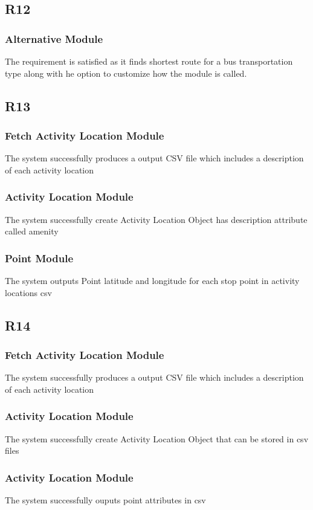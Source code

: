 \documentclass[12pt, titlepage]{article}
\begin{document}
\subsection{R12}
\subsubsection{Alternative Module}
The requirement is satisfied as it finds shortest route for a bus transportation type along with he option to customize how the module is called. 
\subsection{R13}
\subsubsection{Fetch Activity Location Module}
The system successfully produces a output CSV file which includes a description of each activity location

\subsubsection{Activity Location Module}
The system successfully create Activity Location Object has description attribute called amenity

\subsubsection{Point Module}
The system outputs Point latitude and longitude for each stop point in activity locations csv

\subsection{R14}
\subsubsection{Fetch Activity Location Module}
The system successfully produces a output CSV file which includes a description of each activity location

\subsubsection{Activity Location Module}
The system successfully create Activity Location Object that can be stored in csv files

\subsubsection{Activity Location Module}
The system successfully ouputs point attributes in csv
\end{document}
